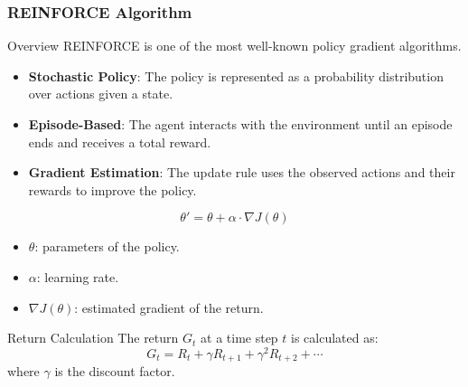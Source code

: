 \documentclass{beamer}
\begin{document}
\begin{frame}[fragile]
    \frametitle{REINFORCE Algorithm}

    \begin{block}{Overview}
        REINFORCE is one of the most well-known policy gradient algorithms. 
    \end{block}

    \begin{itemize}
        \item \textbf{Stochastic Policy}: The policy is represented as a probability distribution over actions given a state.
        \item \textbf{Episode-Based}: The agent interacts with the environment until an episode ends and receives a total reward.
        \item \textbf{Gradient Estimation}: The update rule uses the observed actions and their rewards to improve the policy.
    \end{itemize}
    
    \begin{equation}
        \theta' = \theta + \alpha \cdot \nabla J(\theta)
    \end{equation}
    \begin{itemize}
        \item \( \theta \): parameters of the policy.
        \item \( \alpha \): learning rate.
        \item \( \nabla J(\theta) \): estimated gradient of the return.
    \end{itemize}
    
    \begin{block}{Return Calculation}
        The return \( G_t \) at a time step \( t \) is calculated as:
        \begin{equation}
            G_t = R_t + \gamma R_{t+1} + \gamma^2 R_{t+2} + \cdots
        \end{equation}
        where \( \gamma \) is the discount factor.
    \end{block}
\end{frame}
\end{document}
